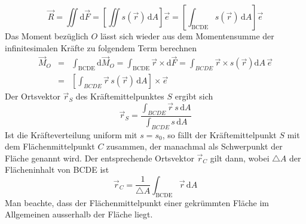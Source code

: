 \begin{equation}
\boxed{\overrightarrow{R}=\displaystyle \iint\text{d}\overrightarrow{F}=\left[\displaystyle \iint s\left(\overrightarrow{r}\right)\,\text{d}A\right]\overrightarrow{e}=\left[\displaystyle \int_{\text{BCDE}}s\left(\overrightarrow{r}\right)\,\text{d}A\right]\overrightarrow{e}}
\end{equation}
Das Moment bezüglich $O$ lässt sich wieder aus dem Momentensumme der infinitesimalen Kräfte zu folgendem Term berechnen
\begin{equation}
\boxed{\begin{array}{lll}\overrightarrow{M}_O&=&\displaystyle \int_{\text{BCDE}}\text{d}\overrightarrow{M}_O=\displaystyle \int_{\text{BCDE}}\overrightarrow{r}\times \text{d}\overrightarrow{F}=\displaystyle \int_{BCDE}\overrightarrow{r}\times s\left(\overrightarrow{r}\right)\text{d}A\,\overrightarrow{e}\\&=&\left[\displaystyle \int_{BCDE}\overrightarrow{r}\,s\left(\overrightarrow{r}\right)\,\text{d}A\right]\times \overrightarrow{e}\end{array}}
\end{equation}
Der Ortsvektor $\overrightarrow{r}_S$ des Kräftemittelpunktes $S$ ergibt sich 
\begin{equation}
\boxed{\overrightarrow{r}_S=\dfrac{\displaystyle \int_{BCDE}\overrightarrow{r}\,s\,\text{d}A}{\displaystyle \int_{BCDE}s\,\text{d}A}}
\end{equation}
Ist die Kräfteverteilung uniform mit $s=s_0$, so fällt der Kräftemittelpunkt $S$ mit dem Flächenmittelpunkt $C$ zusammen, der manachmal als Schwerpunkt der Fläche genannt wird. Der entsprechende Ortsvektor $\overrightarrow{r}_C$ gilt dann, wobei $\triangle A$ der Flächeninhalt von BCDE ist
\begin{equation}
\boxed{\overrightarrow{r}_C=\dfrac{1}{\triangle A}\displaystyle \int_{\text{BCDE}}\overrightarrow{r}\,\text{d}A}
\end{equation}
Man beachte, dass der Flächenmittelpunkt einer gekrümmten Fläche im Allgemeinen ausserhalb der Fläche liegt.
